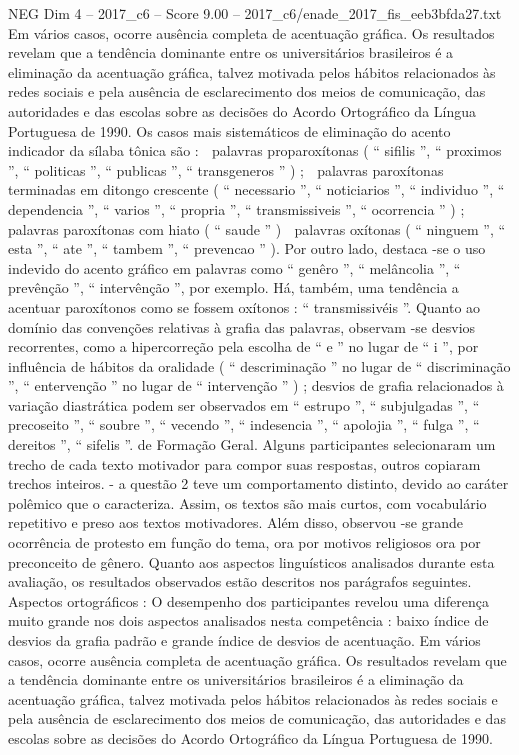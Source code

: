 \begin{textsample}{NEG Dim 4 – 2017\_c6 – Score 9.00 – 2017\_c6/enade\_2017\_fis\_eeb3bfda27.txt}
Em vários casos, ocorre ausência completa de acentuação gráfica.
Os resultados revelam que a tendência dominante entre os universitários brasileiros é a eliminação da acentuação gráfica, talvez motivada pelos hábitos relacionados às redes sociais e pela ausência de esclarecimento dos meios de comunicação, das autoridades e das escolas sobre as decisões do Acordo Ortográfico da Língua Portuguesa de 1990.
Os casos mais sistemáticos de eliminação do acento indicador da sílaba tônica são :  palavras proparoxítonas ( “ sifilis ”, “ proximos ”, “ politicas ”, “ publicas ”, “ transgeneros ” ) ;  palavras paroxítonas terminadas em ditongo crescente ( “ necessario ”, “ noticiarios ”, “ individuo ”, “ dependencia ”, “ varios ”, “ propria ”, “ transmissiveis ”, “ ocorrencia ” ) ;  palavras paroxítonas com hiato ( “ saude ” )  palavras oxítonas ( “ ninguem ”, “ esta ”, “ ate ”, “ tambem ”, “ prevencao ” ).
Por outro lado, destaca -se o uso indevido do acento gráfico em palavras como “ genêro ”, “ melâncolia ”, “ prevênção ”, “ intervênção ”, por exemplo.
Há, também, uma tendência a acentuar paroxítonos como se fossem oxítonos : “ transmissivéis ”.
Quanto ao domínio das convenções relativas à grafia das palavras, observam -se desvios recorrentes, como a hipercorreção pela escolha de “ e ” no lugar de “ i ”, por influência de hábitos da oralidade ( “ descriminação ” no lugar de “ discriminação ”, “ entervenção ” no lugar de “ intervenção ” ) ; desvios de grafia relacionados à variação diastrática podem ser observados em “ estrupo ”, “ subjulgadas ”, “ precoseito ”, “ soubre ”, “ vecendo ”, “ indesencia ”, “ apolojia ”, “ fulga ”, “ dereitos ”, “ sifelis ”. de Formação Geral.
Alguns participantes selecionaram um trecho de cada texto motivador para compor suas respostas, outros copiaram trechos inteiros. - a questão 2 teve um comportamento distinto, devido ao caráter polêmico que o caracteriza.
Assim, os textos são mais curtos, com vocabulário repetitivo e preso aos textos motivadores.
Além disso, observou -se grande ocorrência de protesto em função do tema, ora por motivos religiosos ora por preconceito de gênero.
Quanto aos aspectos linguísticos analisados durante esta avaliação, os resultados observados estão descritos nos parágrafos seguintes.
Aspectos ortográficos : O desempenho dos participantes revelou uma diferença muito grande nos dois aspectos analisados nesta competência : baixo índice de desvios da grafia padrão e grande índice de desvios de acentuação.
Em vários casos, ocorre ausência completa de acentuação gráfica.
Os resultados revelam que a tendência dominante entre os universitários brasileiros é a eliminação da acentuação gráfica, talvez motivada pelos hábitos relacionados às redes sociais e pela ausência de esclarecimento dos meios de comunicação, das autoridades e das escolas sobre as decisões do Acordo Ortográfico da Língua Portuguesa de 1990.

\end{textsample}
